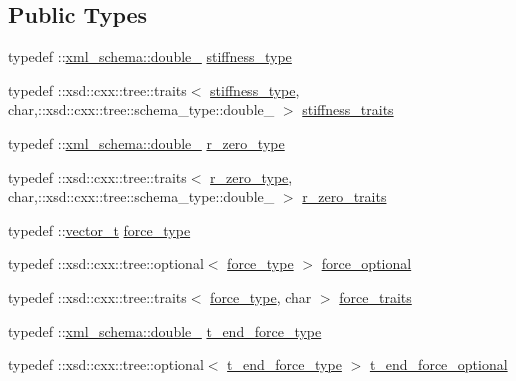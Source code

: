 \subsection*{Public Types}
\begin{DoxyCompactItemize}
\item 
typedef \+::\hyperlink{namespacexml__schema_aac2d3d3483d3a20e8d96d2e8e5b3a470}{xml\+\_\+schema\+::double\+\_\+} \hyperlink{classmembrane__t_a9e55619d3d02a55660849deaa0ca4338}{stiffness\+\_\+type}
\item 
typedef \+::xsd\+::cxx\+::tree\+::traits$<$ \hyperlink{classmembrane__t_a9e55619d3d02a55660849deaa0ca4338}{stiffness\+\_\+type}, char,\+::xsd\+::cxx\+::tree\+::schema\+\_\+type\+::double\+\_\+ $>$ \hyperlink{classmembrane__t_a90e2a51b2f18f88127057a926cce542a}{stiffness\+\_\+traits}
\item 
typedef \+::\hyperlink{namespacexml__schema_aac2d3d3483d3a20e8d96d2e8e5b3a470}{xml\+\_\+schema\+::double\+\_\+} \hyperlink{classmembrane__t_ab1e0c179101c4b2916059925d73468ff}{r\+\_\+zero\+\_\+type}
\item 
typedef \+::xsd\+::cxx\+::tree\+::traits$<$ \hyperlink{classmembrane__t_ab1e0c179101c4b2916059925d73468ff}{r\+\_\+zero\+\_\+type}, char,\+::xsd\+::cxx\+::tree\+::schema\+\_\+type\+::double\+\_\+ $>$ \hyperlink{classmembrane__t_aebe5eb10f95c19f95c3946d3bbb9adb8}{r\+\_\+zero\+\_\+traits}
\item 
typedef \+::\hyperlink{classvector__t}{vector\+\_\+t} \hyperlink{classmembrane__t_ab4d91a3ba331c16adbf69418f876f849}{force\+\_\+type}
\item 
typedef \+::xsd\+::cxx\+::tree\+::optional$<$ \hyperlink{classmembrane__t_ab4d91a3ba331c16adbf69418f876f849}{force\+\_\+type} $>$ \hyperlink{classmembrane__t_a558422b23faa72b3e4cbc060f9ff8ea3}{force\+\_\+optional}
\item 
typedef \+::xsd\+::cxx\+::tree\+::traits$<$ \hyperlink{classmembrane__t_ab4d91a3ba331c16adbf69418f876f849}{force\+\_\+type}, char $>$ \hyperlink{classmembrane__t_a2b6b177c77d6eddf152913810d47f7f7}{force\+\_\+traits}
\item 
typedef \+::\hyperlink{namespacexml__schema_aac2d3d3483d3a20e8d96d2e8e5b3a470}{xml\+\_\+schema\+::double\+\_\+} \hyperlink{classmembrane__t_a9c464d55e3d8162b6bb521d9dd6d761d}{t\+\_\+end\+\_\+force\+\_\+type}
\item 
typedef \+::xsd\+::cxx\+::tree\+::optional$<$ \hyperlink{classmembrane__t_a9c464d55e3d8162b6bb521d9dd6d761d}{t\+\_\+end\+\_\+force\+\_\+type} $>$ \hyperlink{classmembrane__t_a7725d61ae95e124d402a8d9db7a08376}{t\+\_\+end\+\_\+force\+\_\+optional}

\end{DoxyCompactItemize}
